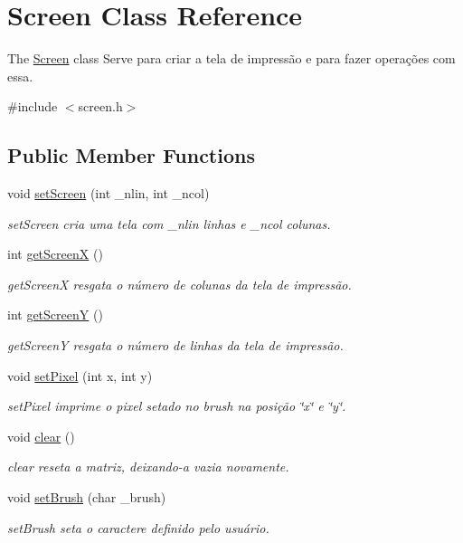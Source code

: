 \hypertarget{classScreen}{}\section{Screen Class Reference}
\label{classScreen}


The \hyperlink{classScreen}{Screen} class Serve para criar a tela de impressão e para fazer operações com essa.  




{\ttfamily \#include $<$screen.\+h$>$}

\subsection*{Public Member Functions}
\begin{DoxyCompactItemize}
\item 
void \hyperlink{classScreen_ac197328663f3a04f30d65f923df8f519}{set\+Screen} (int \+\_\+nlin, int \+\_\+ncol)
\begin{DoxyCompactList}\small\item\em set\+Screen cria uma tela com \+\_\+nlin linhas e \+\_\+ncol colunas. \end{DoxyCompactList}\item 
int \hyperlink{classScreen_a36c5ad5922aaead1d99a00111bb7a899}{get\+ScreenX} ()
\begin{DoxyCompactList}\small\item\em get\+ScreenX resgata o número de colunas da tela de impressão. \end{DoxyCompactList}\item 
int \hyperlink{classScreen_ab0897ac045a861b0d21b2c8899096605}{get\+ScreenY} ()
\begin{DoxyCompactList}\small\item\em get\+ScreenY resgata o número de linhas da tela de impressão. \end{DoxyCompactList}\item 
void \hyperlink{classScreen_ae6bea81c57a22d226507c3c26fa95ee0}{set\+Pixel} (int x, int y)
\begin{DoxyCompactList}\small\item\em set\+Pixel imprime o pixel setado no brush na posição \char`\"{}x\char`\"{} e \char`\"{}y\char`\"{}. \end{DoxyCompactList}\item 
void \hyperlink{classScreen_a35e74266b2a04e37b354ceff7a5f1031}{clear} ()\hypertarget{classScreen_a35e74266b2a04e37b354ceff7a5f1031}{}\label{classScreen_a35e74266b2a04e37b354ceff7a5f1031}

\begin{DoxyCompactList}\small\item\em clear reseta a matriz, deixando-\/a vazia novamente. \end{DoxyCompactList}\item 
void \hyperlink{classScreen_aebc4eb6cb5acf15a0f04c1494622ab23}{set\+Brush} (char \+\_\+brush)
\begin{DoxyCompactList}\small\item\em set\+Brush seta o caractere definido pelo usuário. \end{DoxyCompactList}\end{DoxyCompactItemize}
